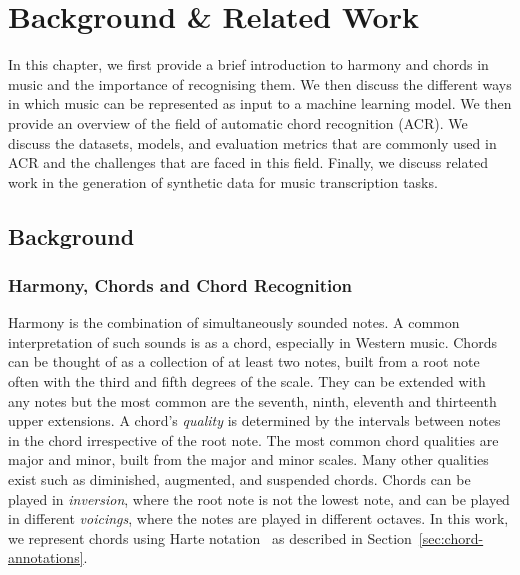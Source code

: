 \chapter{Background \& Related Work}

In this chapter, we first provide a brief introduction to harmony and chords in music and the importance of recognising them. We then discuss the different ways in which music can be represented as input to a machine learning model. We then provide an overview of the field of automatic chord recognition (ACR). We discuss the datasets, models, and evaluation metrics that are commonly used in ACR and the challenges that are faced in this field. Finally, we discuss related work in the generation of synthetic data for music transcription tasks.

\section{Background}

\subsection{Harmony, Chords and Chord Recognition}

Harmony is the combination of simultaneously sounded notes. A common interpretation of such sounds is as a chord, especially in Western music. Chords can be thought of as a collection of at least two notes, built from a root note often with the third and fifth degrees of the scale. They can be extended with any notes but the most common are the seventh, ninth, eleventh and thirteenth upper extensions. A chord's \emph{quality} is determined by the intervals between notes in the chord irrespective of the root note. The most common chord qualities are major and minor, built from the major and minor scales. Many other qualities exist such as diminished, augmented, and suspended chords. Chords can be played in \emph{inversion}, where the root note is not the lowest note, and can be played in different \emph{voicings}, where the notes are played in different octaves. In this work, we represent chords using Harte notation~\citep{HarteNotation} as described in Section~\ref{sec:chord-annotations}.

